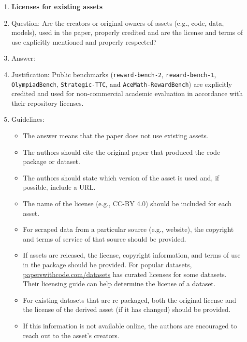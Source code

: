 \documentclass{article}
\theoremstyle{plain}
\theoremstyle{definition}
\theoremstyle{remark}
\begin{document}
\begin{enumerate}
\item {\bf Licenses for existing assets}
    \item[] Question: Are the creators or original owners of assets (e.g., code, data, models), used in the paper, properly credited and are the license and terms of use explicitly mentioned and properly respected?
    \item[] Answer: \answerYes{}
    \item[] Justification: Public benchmarks (\texttt{reward-bench-2}, \texttt{reward-bench-1}, \texttt{OlympiadBench}, \texttt{Strategic-TTC}, and \texttt{AceMath-RewardBench}) are explicitly credited and used for non-commercial academic evaluation in accordance with their repository licenses.
    \item[] Guidelines:
    \begin{itemize}
        \item The answer \answerNA{} means that the paper does not use existing assets.
        \item The authors should cite the original paper that produced the code package or dataset.
        \item The authors should state which version of the asset is used and, if possible, include a URL.
        \item The name of the license (e.g., CC-BY 4.0) should be included for each asset.
        \item For scraped data from a particular source (e.g., website), the copyright and terms of service of that source should be provided.
        \item If assets are released, the license, copyright information, and terms of use in the package should be provided. For popular datasets, \url{paperswithcode.com/datasets} has curated licenses for some datasets. Their licensing guide can help determine the license of a dataset.
        \item For existing datasets that are re-packaged, both the original license and the license of the derived asset (if it has changed) should be provided.
        \item If this information is not available online, the authors are encouraged to reach out to the asset's creators.
    \end{itemize}


\end{enumerate}
\end{document}
